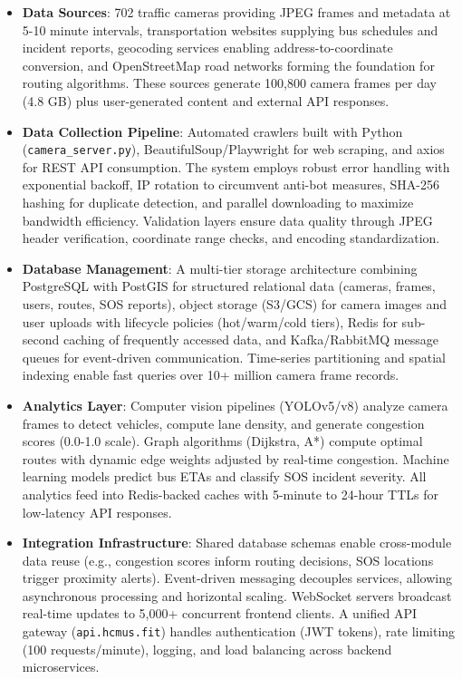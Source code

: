 \begin{itemize}
    \item \textbf{Data Sources}: 702 traffic cameras providing JPEG frames and metadata at 5-10 minute intervals, transportation websites supplying bus schedules and incident reports, geocoding services enabling address-to-coordinate conversion, and OpenStreetMap road networks forming the foundation for routing algorithms. These sources generate 100,800 camera frames per day (4.8 GB) plus user-generated content and external API responses.
    
    \item \textbf{Data Collection Pipeline}: Automated crawlers built with Python (\texttt{camera\_server.py}), BeautifulSoup/Playwright for web scraping, and axios for REST API consumption. The system employs robust error handling with exponential backoff, IP rotation to circumvent anti-bot measures, SHA-256 hashing for duplicate detection, and parallel downloading to maximize bandwidth efficiency. Validation layers ensure data quality through JPEG header verification, coordinate range checks, and encoding standardization.
    
    \item \textbf{Database Management}: A multi-tier storage architecture combining PostgreSQL with PostGIS for structured relational data (cameras, frames, users, routes, SOS reports), object storage (S3/GCS) for camera images and user uploads with lifecycle policies (hot/warm/cold tiers), Redis for sub-second caching of frequently accessed data, and Kafka/RabbitMQ message queues for event-driven communication. Time-series partitioning and spatial indexing enable fast queries over 10+ million camera frame records.
    
    \item \textbf{Analytics Layer}: Computer vision pipelines (YOLOv5/v8) analyze camera frames to detect vehicles, compute lane density, and generate congestion scores (0.0-1.0 scale). Graph algorithms (Dijkstra, A*) compute optimal routes with dynamic edge weights adjusted by real-time congestion. Machine learning models predict bus ETAs and classify SOS incident severity. All analytics feed into Redis-backed caches with 5-minute to 24-hour TTLs for low-latency API responses.
    
    \item \textbf{Integration Infrastructure}: Shared database schemas enable cross-module data reuse (e.g., congestion scores inform routing decisions, SOS locations trigger proximity alerts). Event-driven messaging decouples services, allowing asynchronous processing and horizontal scaling. WebSocket servers broadcast real-time updates to 5,000+ concurrent frontend clients. A unified API gateway (\texttt{api.hcmus.fit}) handles authentication (JWT tokens), rate limiting (100 requests/minute), logging, and load balancing across backend microservices.
    

\end{itemize}
